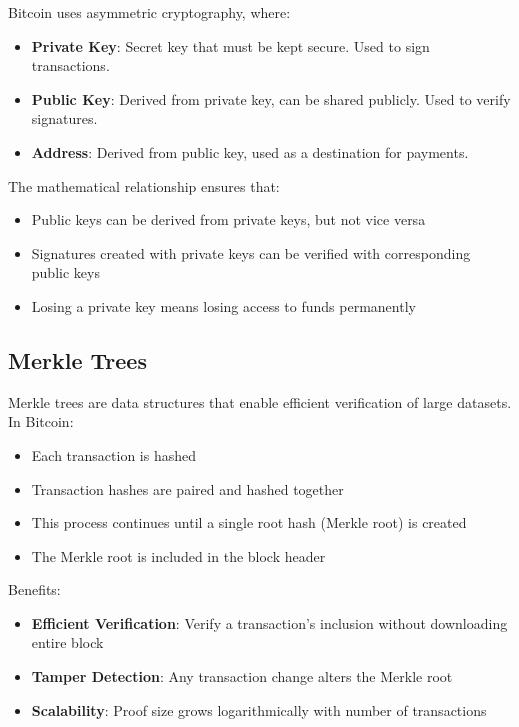 Bitcoin uses asymmetric cryptography, where:
\begin{itemize}
  \item \textbf{Private Key}: Secret key that must be kept secure. Used to sign transactions.
  \item \textbf{Public Key}: Derived from private key, can be shared publicly. Used to verify signatures.
  \item \textbf{Address}: Derived from public key, used as a destination for payments.
\end{itemize}

The mathematical relationship ensures that:
\begin{itemize}
  \item {}Public keys can be derived from private keys, but not vice versa
  \item {}Signatures created with private keys can be verified with corresponding public keys
  \item Losing a private key means losing access to funds permanently
\end{itemize}

\subsection{Merkle Trees}
\label{subsec:merkle-trees}

Merkle trees are data structures that enable efficient verification of large datasets. In Bitcoin:

\begin{itemize}
  \item Each transaction is hashed
  \item {}Transaction hashes are paired and hashed together
  \item This process continues until a single root hash (Merkle root) is created
  \item The Merkle root is included in the block header
\end{itemize}

\needspace{1.5in}
Benefits:
\begin{itemize}
  \item \textbf{Efficient Verification}: Verify a transaction's inclusion without downloading entire block
  \item \textbf{Tamper Detection}: Any transaction change alters the Merkle root
  \item \textbf{Scalability}: Proof size grows logarithmically with number of transactions
\end{itemize}

